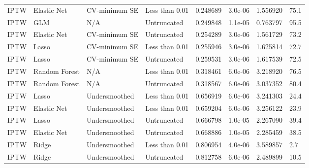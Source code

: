 \begin{longtable}[l]{llllllll}
IPTW & Elastic Net & CV-minimum SE & Less than 0.01 & 0.248689 & 3.0e-06 & 1.556920 & 75.1\\
IPTW & GLM & N/A & Untruncated & 0.249848 & 1.1e-05 & 0.763797 & 95.5\\
IPTW & Elastic Net & CV-minimum SE & Untruncated & 0.254289 & 3.0e-06 & 1.561729 & 73.2\\
IPTW & Lasso & CV-minimum SE & Less than 0.01 & 0.255946 & 3.0e-06 & 1.625814 & 72.7\\
IPTW & Lasso & CV-minimum SE & Untruncated & 0.259531 & 3.0e-06 & 1.617539 & 72.5\\
IPTW & Random Forest & N/A & Less than 0.01 & 0.318461 & 6.0e-06 & 3.218920 & 76.5\\
IPTW & Random Forest & N/A & Untruncated & 0.318567 & 6.0e-06 & 3.037352 & 80.4\\
IPTW & Lasso & Undersmoothed & Less than 0.01 & 0.656919 & 6.0e-06 & 3.241303 & 24.4\\
IPTW & Elastic Net & Undersmoothed & Less than 0.01 & 0.659204 & 6.0e-06 & 3.256122 & 23.9\\
IPTW & Lasso & Undersmoothed & Untruncated & 0.666798 & 1.0e-05 & 2.267090 & 39.4\\
IPTW & Elastic Net & Undersmoothed & Untruncated & 0.668886 & 1.0e-05 & 2.285459 & 38.5\\
IPTW & Ridge & Undersmoothed & Less than 0.01 & 0.806954 & 4.0e-06 & 3.589857 & 2.7\\
IPTW & Ridge & Undersmoothed & Untruncated & 0.812758 & 6.0e-06 & 2.489899 & 10.5\\
\bottomrule
\end{longtable}
